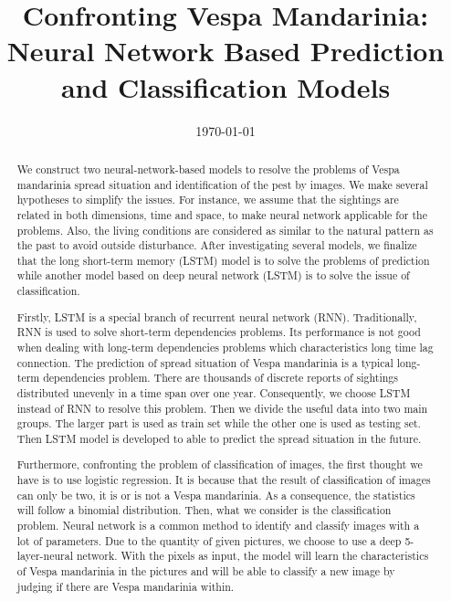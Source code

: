 \documentclass{mcmthesis}
\begin{document}
\linespread{0.6}
\setlength{\parskip}{0.5\baselineskip}
\title{Confronting Vespa Mandarinia: Neural Network Based Prediction and Classification Models}

\date{\today}
\begin{abstract}

We construct two neural-network-based models to resolve the problems of Vespa mandarinia spread situation and identification of the pest by images. We make several hypotheses to simplify the issues. For instance, we assume that the sightings are related in both dimensions, time and space, to make neural network applicable for the problems. Also, the living conditions are considered as similar to the natural pattern as the past to avoid outside disturbance. After investigating several models, we finalize that the long short-term memory (LSTM) model is to solve the problems of prediction while another model based on deep neural network (LSTM) is to solve the issue of classification.

Firstly, LSTM is a special branch of recurrent neural network (RNN). Traditionally, RNN is used to solve short-term dependencies problems. Its performance is not good when dealing with long-term dependencies problems which characteristics long time lag connection. The prediction of spread situation of Vespa mandarinia is a typical long-term dependencies problem. There are thousands of discrete reports of sightings distributed unevenly in a time span over one year. Consequently, we choose LSTM instead of RNN to resolve this problem. Then we divide the useful data into two main groups. The larger part is used as train set while the other one is used as testing set. Then LSTM model is developed to able to predict the spread situation in the future.

Furthermore, confronting the problem of classification of images, the first thought we have is to use logistic regression. It is because that the result of classification of images can only be two, it is or is not a Vespa mandarinia. As a consequence, the statistics will follow a binomial distribution. Then, what we consider is the classification problem. Neural network is a common method to identify and classify images with a lot of parameters. Due to the quantity of given pictures, we choose to use a deep 5-layer-neural network. With the pixels as input, the model will learn the characteristics of Vespa mandarinia in the pictures and will be able to classify a new image by judging if there are Vespa mandarinia within.


\end{abstract}
\end{document}
